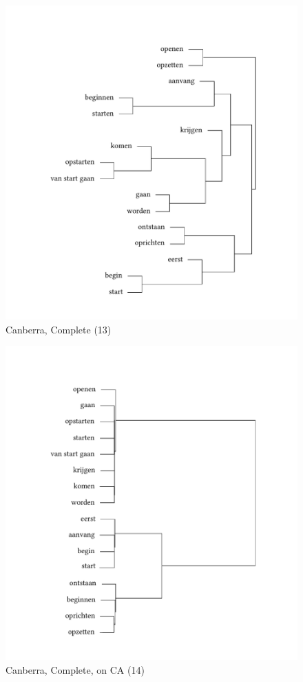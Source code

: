 \begin{figure}
\includegraphics[height=.4\textheight]{figures/tree42.pdf}
\caption{\label{fig:3:42}  Canberra, Complete (13)}
\end{figure}

\begin{figure}
\includegraphics[height=.4\textheight]{figures/tree43.pdf}
\caption{\label{fig:3:43}  Canberra, Complete, on CA (14)}
\end{figure}

